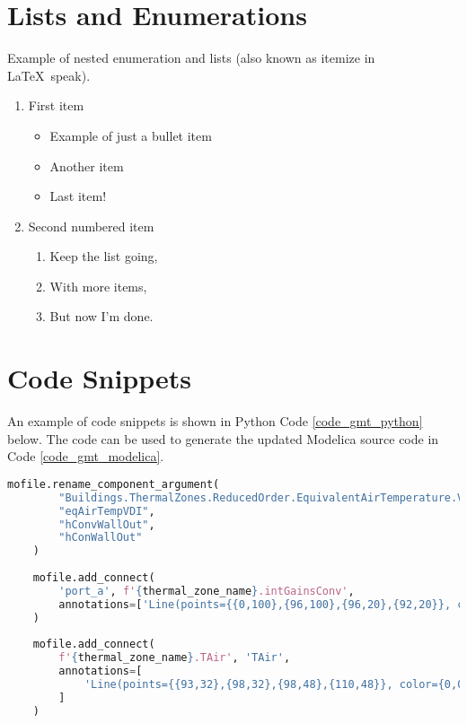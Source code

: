 \section{Lists and Enumerations}

Example of nested enumeration and lists (also known as itemize in \LaTeX\ speak).

\begin{enumerate}
	\item First item
	\begin{itemize}
		\item Example of just a bullet item
		\item Another item
		\item Last item!
	\end{itemize}

	\item Second numbered item
	\begin{enumerate}
		\item Keep the list going,
		\item With more items,
		\item But now I'm done.
	\end{enumerate}
\end{enumerate}

\section{Code Snippets}

An example of code snippets is shown in Python Code \ref{code_gmt_python} below. The code can be used to generate the updated Modelica source code in Code \ref{code_gmt_modelica}.

\begin{lstlisting}[language=Python, backgroundcolor=\color{aliceblue}, caption={Python snippets of Modelica Builder commands}, captionpos=b, label={code_gmt_python}]
	mofile.rename_component_argument(
		"Buildings.ThermalZones.ReducedOrder.EquivalentAirTemperature.VDI6007",
		"eqAirTempVDI",
		"hConvWallOut",
		"hConWallOut"
	)
	
	mofile.add_connect(
		'port_a', f'{thermal_zone_name}.intGainsConv',
		annotations=['Line(points={{0,100},{96,100},{96,20},{92,20}}, color={191,0,0})']
	)
	
	mofile.add_connect(
		f'{thermal_zone_name}.TAir', 'TAir',
		annotations=[
			'Line(points={{93,32},{98,32},{98,48},{110,48}}, color={0,0,127})'
		]
	)
\end{lstlisting}

